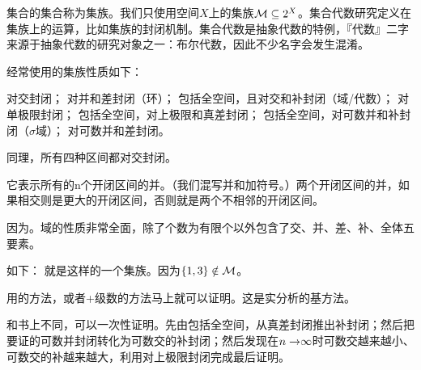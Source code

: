 集合的集合称为集族。我们只使用空间$X$上的集族$\mbox{$\mathcal{M}$}\subseteq2^X$。集合代数研究定义在集族上的运算，比如集族的封闭机制。集合代数是抽象代数的特例，『代数』二字来源于抽象代数的研究对象之一：布尔代数，因此不少名字会发生混淆。

经常使用的集族性质如下：

\begin{yxlb}
\tiao 对交封闭；
\tiao 对并和差封闭（环）；
\tiao 包括全空间，且对交和补封闭（域/代数）；
\tiao 对单极限封闭；
\tiao 包括全空间，对上极限和真差封闭；
\tiao 包括全空间，对可数并和补封闭（$\sigma$域）；
\tiao 对可数并和差封闭。

\end{yxlb}

\ls{例1：$(-\wuq,a]$的族对交封闭。}同理，所有四种区间都对交封闭。



\ls{例4：$\qh_{n=1}^{\wuq}\{\qh_{k=1}^{n}(a_k,b_k]\}$是$\RR$上的环。}它表示所有的n个开闭区间的并。（我们混写并和加符号。）两个开闭区间的并，如果相交则是更大的开闭区间，否则就是两个不相邻的开闭区间。


因为。域的性质非常全面，除了个数为有限个以外包含了交、并、差、补、全体五要素。





如下：
就是这样的一个集族。因为$\{1,3\}\notin \mbox{$\mathcal{M}$}$。

用的方法，或者+级数的方法马上就可以证明。这是实分析的基方法。

和书上不同，可以一次性证明。先由包括全空间，从真差封闭推出补封闭；然后把要证的可数并封闭转化为可数交的补封闭；然后发现在$n\mbox{$\;\to$}\infty$时可数交越来越小、可数交的补越来越大，利用对上极限封闭完成最后证明。

